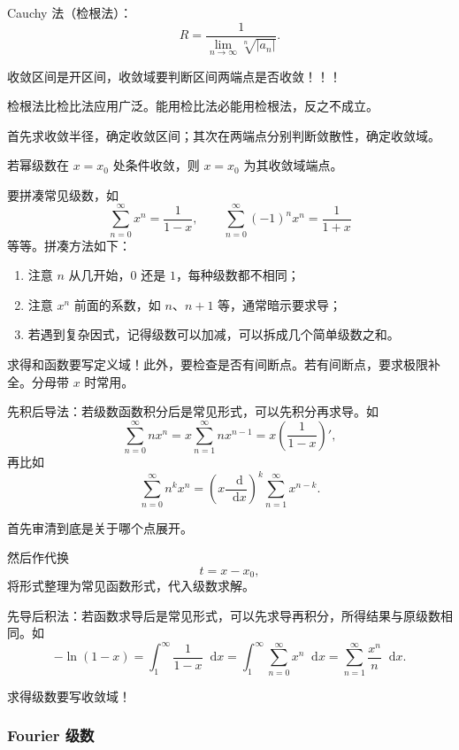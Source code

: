 \documentclass[UTF8,fontset=fandol,zihao=5]{ctexart}
\newcommand{\dd}{\mathop{}\!\mathrm{d}}
\begin{document}
Cauchy 法（检根法）：
\[
R=\frac1{\displaystyle\lim_{n\to\infty}\sqrt[n]{|a_n|}}.
\]

收敛区间是开区间，收敛域要判断区间两端点是否收敛！！！

检根法比检比法应用广泛。能用检比法必能用检根法，反之不成立。

\begin{method}[求幂级数收敛域]
首先求收敛半径，确定收敛区间；其次在两端点分别判断敛散性，确定收敛域。

若幂级数在 $x=x_0$ 处条件收敛，则 $x=x_0$ 为其收敛域端点。
\end{method}

\begin{method}[求函数项级数和函数]
要拼凑常见级数，如
\[
\sum_{n=0}^{\infty}x^n=\frac1{1-x},
\qquad
\sum_{n=0}^{\infty}(-1)^nx^n=\frac1{1+x}
\]
等等。拼凑方法如下：

\begin{enumerate}
  \item 注意 $n$ 从几开始，$0$ 还是 $1$，每种级数都不相同；
  \item 注意 $x^n$ 前面的系数，如 $n$、$n+1$ 等，通常暗示要求导；
  \item 若遇到复杂因式，记得级数可以加减，可以拆成几个简单级数之和。
\end{enumerate}

求得和函数要写定义域！此外，要检查是否有间断点。若有间断点，要求极限补全。分母带 $x$ 时常用。

先积后导法：若级数函数积分后是常见形式，可以先积分再求导。如
\[
\sum_{n=0}^{\infty}nx^n
=x\sum_{n=1}^{\infty}nx^{n-1}
=x\left(\frac1{1-x}\right)',
\]
再比如
\[
\sum_{n=0}^{\infty}n^kx^n
=\left(x\frac{\dd}{\dd x}\right)^k
\sum_{n=1}^{\infty}x^{n-k}.
\]
\end{method}

\begin{method}
首先审清到底是关于哪个点展开。

然后作代换
\[
t=x-x_0,
\]
将形式整理为常见函数形式，代入级数求解。

先导后积法：若函数求导后是常见形式，可以先求导再积分，所得结果与原级数相同。如
\[
-\ln(1-x)=\int_1^{\infty}\frac{1}{1-x}\dd x
=\int_1^{\infty}\sum_{n=0}^{\infty}x^n\dd x
=\sum_{n=1}^{\infty}\frac{x^n}{n}\dd x.
\]

求得级数要写收敛域！
\end{method}

\subsubsection{Fourier 级数}
\end{document}
